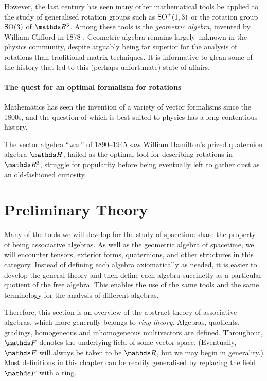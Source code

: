 However, the last century has seen many other mathematical tools be applied to the study of generalised rotation groups such as $\operatorname{SO}^+(1,3)$ or the rotation group $\operatorname{SO}(3)$ of $\RR^3$.
Among these tools is the \emph{geometric algebra}, invented by William Clifford in 1878 \cite{clifford1878grassmann}.
Geometric algebra remains largely unknown in the physics community, despite arguably being far superior for the analysis of rotations than traditional matrix techniques.
It is informative to glean some of the history that led to this (perhaps unfortunate) state of affairs.

\subsubsection{The quest for an optimal formalism for rotations}

Mathematics has seen the invention of a variety of vector formalisms since the 1800s, and the question of which is best suited to physics has a long contentious history.

The vector algebra ``war'' of 1890--1945 saw William Hamilton's prized quaternion algebra $\HH$, hailed as the optimal tool for describing rotations in $\RR^3$, struggle for popularity before being eventually left to gather dust as an old-fashioned curiosity.



\chapter{Preliminary Theory}


Many of the tools we will develop for the study of spacetime share the property of being associative algebras.
As well as the geometric algebra of spacetime, we will encounter tensors, exterior forms, quaternions, and other structures in this category.
Instead of defining each algebra axiomatically as needed, it is easier to develop the general theory and then define each algebra succinctly as a particular quotient of the free algebra.
This enables the use of the same tools and the same terminology for the analysis of different algebras.

Therefore, this section is an overview of the abstract theory of associative algebras, which more generally belongs to \emph{ring theory}.
Algebras, quotients, gradings, homogeneous and inhomogeneous multivectors are defined.
Throughout, $\FF$ denotes the underlying field of some vector space.
(Eventually, $\FF$ will always be taken to be $\RR$, but we may begin in generality.)
Most definitions in this chapter can be readily generalised by replacing the field $\FF$ with a ring.

